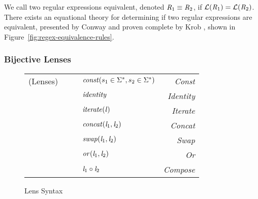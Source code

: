 We call two regular expressions equivalent, denoted $\mathit{R}_1\equiv\mathit{R}_2$,
if $\mathcal{L}(\mathit{R}_1)=\mathcal{L}(\mathit{R}_2)$.
There exists an equational theory for determining if two regular expressions are equivalent,
presented by Conway \cite{conway}
and proven complete by Krob \cite{Krob},
shown in Figure~\ref{fig:regex-equivalence-rules}.

\subsubsection{Bijective Lenses}

\begin{figure}
\centering
\begin{tabular}{l@{\ }l@{\ }c@{\ }l@{\ }>{\itshape\/}r}
(Lenses)& \Lens{} & \GEq{} & $\mathit{const}(s_1 \in \Sigma^*,s_2 \in \Sigma^*)$ & Const \\
& & & \GBar{} $\mathit{identity}$ & Identity\\
& & & \GBar{} $\mathit{iterate(\mathit{l})}$ & Iterate \\
& & & \GBar{} $\mathit{concat}(\mathit{l}_1,\mathit{l}_2)$ & Concat \\
& & & \GBar{} $\mathit{swap}(\mathit{l}_1,\mathit{l}_2)$ & Swap\\
& & & \GBar{} $\mathit{or}(\mathit{l}_1,\mathit{l}_2)$ & Or\\
& & & \GBar{} $\mathit{l}_1 \circ \mathit{l}_2$ & Compose\\
\end{tabular}
\caption{Lens Syntax}
\label{fig:lens-syntax}
\end{figure}


